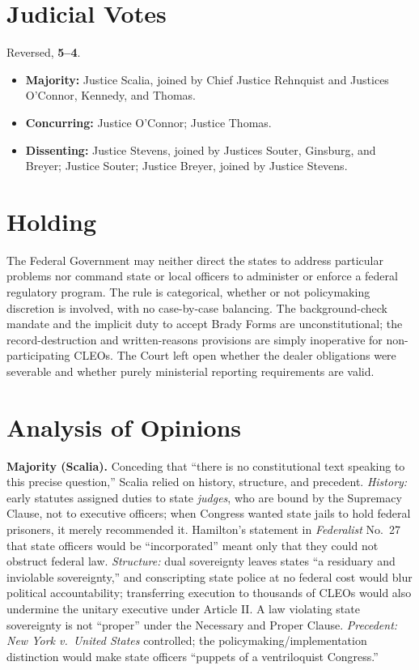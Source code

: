 \documentclass[12pt]{article}
\begin{document}
\section{Judicial Votes}

Reversed, \textbf{5--4}.
\begin{itemize}
\item \textbf{Majority:} Justice Scalia, joined by Chief Justice Rehnquist and Justices O'Connor, Kennedy, and Thomas.
\item \textbf{Concurring:} Justice O'Connor; Justice Thomas.
\item \textbf{Dissenting:} Justice Stevens, joined by Justices Souter, Ginsburg, and Breyer; Justice Souter; Justice Breyer, joined by Justice Stevens.
\end{itemize}

\section{Holding}

The Federal Government may neither direct the states to address particular problems nor command state or local officers to administer or enforce a federal regulatory program. The rule is categorical, whether or not policymaking discretion is involved, with no case-by-case balancing. The background-check mandate and the implicit duty to accept Brady Forms are unconstitutional; the record-destruction and written-reasons provisions are simply inoperative for non-participating CLEOs. The Court left open whether the dealer obligations were severable and whether purely ministerial reporting requirements are valid.

\section{Analysis of Opinions}

\textbf{Majority (Scalia).} Conceding that ``there is no constitutional text speaking to this precise question,'' Scalia relied on history, structure, and precedent. \emph{History:} early statutes assigned duties to state \emph{judges}, who are bound by the Supremacy Clause, not to executive officers; when Congress wanted state jails to hold federal prisoners, it merely recommended it. Hamilton's statement in \textit{Federalist} No.\ 27 that state officers would be ``incorporated'' meant only that they could not obstruct federal law. \emph{Structure:} dual sovereignty leaves states ``a residuary and inviolable sovereignty,'' and conscripting state police at no federal cost would blur political accountability; transferring execution to thousands of CLEOs would also undermine the unitary executive under Article II. A law violating state sovereignty is not ``proper'' under the Necessary and Proper Clause. \emph{Precedent:} \textit{New York v.\ United States} controlled; the policymaking/implementation distinction would make state officers ``puppets of a ventriloquist Congress.''
\end{document}
